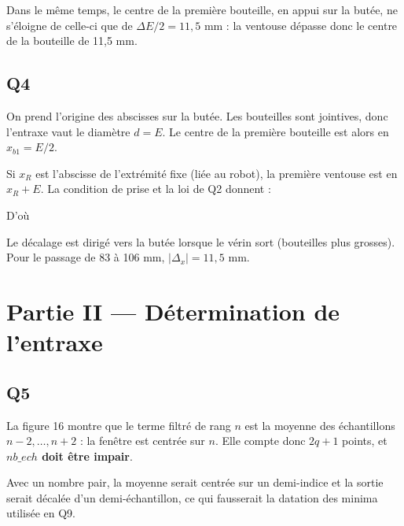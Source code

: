 \documentclass[11pt,a4paper]{article}
\newcommand{\equationajustee}[1]{%
  \sbox{\boiteequation}{$\displaystyle #1$}%
  \ifdim\wd\boiteequation>\linewidth
    \[\resizebox{\linewidth}{!}{\usebox{\boiteequation}}\]%
  \else
    \[#1\]%
  \fi}
\begin{document}
Dans le même temps, le centre de la première bouteille, en appui sur la butée, ne s'éloigne de celle-ci que de \(\Delta E/2=11{,}5\) mm : la ventouse dépasse donc le centre de la bouteille de 11,5 mm.

\hypertarget{q4}{%
\subsection{Q4}\label{q4}}

On prend l'origine des abscisses sur la butée. Les bouteilles sont jointives, donc l'entraxe vaut le diamètre \(d=E\). Le centre de la première bouteille est alors en \(x_{b1}=E/2\).

Si \(x_R\) est l'abscisse de l'extrémité fixe (liée au robot), la première ventouse est en \(x_R+E\). La condition de prise et la loi de Q2 donnent :

\equationajustee{\begin{aligned}
x_R+E&=\frac E2\\
x_R&=-\frac E2\\
\Delta x_R&=-\frac{\Delta E}{2}\quad\text{avec}\quad\Delta E=\frac{\Delta\lambda}{5}
\end{aligned}}

D'où

\equationajustee{\boxed{\Delta_x=-\frac{\Delta\lambda}{10}}}

Le décalage est dirigé vers la butée lorsque le vérin sort (bouteilles plus grosses). Pour le passage de 83 à 106 mm, \(|\Delta_x|=11{,}5\) mm.

\hypertarget{partie-ii-duxe9termination-de-lentraxe}{%
\section{Partie II --- Détermination de l'entraxe}\label{partie-ii-duxe9termination-de-lentraxe}}

\hypertarget{q5}{%
\subsection{Q5}\label{q5}}

La figure 16 montre que le terme filtré de rang \(n\) est la moyenne des échantillons \(n-2,\dots,n+2\) : la fenêtre est centrée sur \(n\). Elle compte donc \(2q+1\) points, et \textbf{\(nb\_ech\) doit être impair}.

Avec un nombre pair, la moyenne serait centrée sur un demi-indice et la sortie serait décalée d'un demi-échantillon, ce qui fausserait la datation des minima utilisée en Q9.
\end{document}
